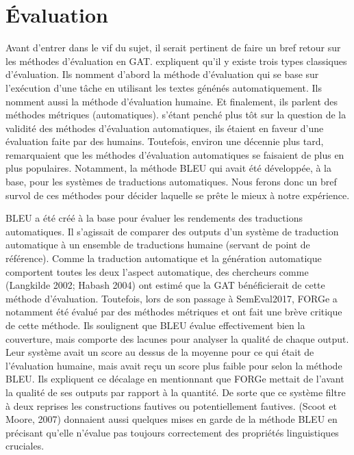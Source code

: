 \chapter{Évaluation}\label{ch:eval}

Avant d'entrer dans le vif du sujet, il serait pertinent de faire un bref retour sur les méthodes d'évaluation en \ac{GAT}. \cite{ReiterInvestigationValidityMetrics2009} expliquent qu'il y existe trois types classiques d'évaluation. Ils nomment d'abord la méthode d'évaluation qui se base sur l'exécution d'une tâche en utilisant les textes génénés automatiquement. Ils nomment aussi la méthode d'évaluation humaine. Et finalement, ils parlent des méthodes métriques (automatiques). \cite{ReiterBuildingNaturalLanguage2000} s'étant penché plus tôt sur la question de la validité des méthodes d'évaluation automatiques, ils étaient en faveur d'une évaluation faite par des humains. Toutefois, environ une décennie plus tard, \cite{ReiterInvestigationValidityMetrics2009} remarquaient que les méthodes d'évaluation automatiques se faisaient de plus en plus populaires. Notamment, la méthode BLEU qui avait été développée, à la base, pour les systèmes de traductions automatiques. Nous ferons donc un bref survol de ces méthodes pour décider laquelle se prête le mieux à notre expérience.

BLEU a été créé à la base pour évaluer les rendements des traductions automatiques. Il s'agissait de comparer des outputs d'un système de traduction automatique à un ensemble de traductions humaine (servant de point de référence). Comme la traduction automatique et la génération automatique comportent toutes les deux l'aspect automatique, des chercheurs comme (Langkilde 2002; Habash 2004) ont estimé que la \ac{GAT} bénéficierait de cette méthode d'évaluation. Toutefois, lors de son passage à SemEval2017, FORGe a notamment été évalué par des méthodes métriques et \cite{DBLP:conf/semeval/MilleCBW17} ont fait une brève critique de cette méthode. Ils soulignent que BLEU évalue effectivement bien la couverture, mais comporte des lacunes pour analyser la qualité de chaque output. Leur système avait un score au dessus de la moyenne pour ce qui était de l'évaluation humaine, mais avait reçu un score plus faible pour selon la méthode BLEU. Ils expliquent ce décalage en mentionnant que FORGe mettait de l'avant la qualité de ses outputs par rapport à la quantité. De sorte que ce système filtre à deux reprises les constructions fautives ou potentiellement fautives. (Scoot et Moore, 2007) donnaient aussi quelques mises en garde de la méthode BLEU en précisant qu'elle n'évalue pas toujours correctement des propriétés linguistiques cruciales.

